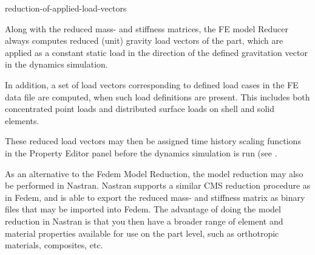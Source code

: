 


           {reduction-of-applied-load-vectors}

Along with the reduced mass- and stiffness matrices, the FE model
Reducer always computes reduced (unit) gravity load vectors of the part,
which are applied as a constant static load in the direction of the
defined gravitation vector in the dynamics simulation.

In addition, a set of load vectors corresponding to defined load cases
in the FE data file are computed, when such load definitions are present.
This includes both concentrated point loads and distributed surface loads
on shell and solid elements.

These reduced load vectors may then be assigned time history scaling functions
in the Property Editor panel before the dynamics simulation is run
(see .



As an alternative to the Fedem Model Reduction, the model reduction may
also be performed in Nastran. Nastran supports a similar CMS reduction
procedure as in Fedem, and is able to export the reduced mass- and
stiffness matrix as binary files that may be imported into Fedem. The
advantage of doing the model reduction in Nastran is that you then have
a broader range of element and material properties available for use on
the part level, such as orthotropic materials, composites, etc.



